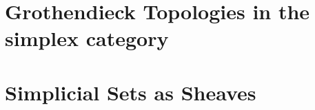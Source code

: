 \section{Grothendieck Topologies in the simplex category}
\label{sec:3}

\section{Simplicial Sets as Sheaves}
\label{sec:4}











